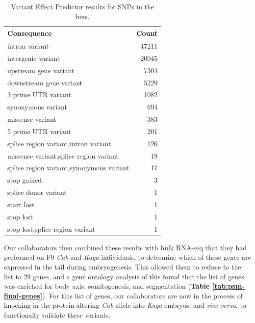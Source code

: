 \documentclass[
]{book}
\begin{document}
\begin{table}

\caption{\label{tab:int-consequence-tbl}Variant Effect Predictor results for SNPs in the bins.}
\centering
\begin{tabular}[t]{l|r}
\hline
Consequence & Count\\
\hline
intron variant & 47211\\
\hline
intergenic variant & 20045\\
\hline
upstream gene variant & 7304\\
\hline
downstream gene variant & 5229\\
\hline
3 prime UTR variant & 1082\\
\hline
synonymous variant & 694\\
\hline
missense variant & 383\\
\hline
5 prime UTR variant & 201\\
\hline
splice region variant,intron variant & 126\\
\hline
missense variant,splice region variant & 19\\
\hline
splice region variant,synonymous variant & 17\\
\hline
stop gained & 3\\
\hline
splice donor variant & 1\\
\hline
start lost & 1\\
\hline
stop lost & 1\\
\hline
stop lost,splice region variant & 1\\
\hline
\end{tabular}
\end{table}

Our collaborators then combined these results with bulk RNA-seq that they had performed on F0 \emph{Cab} and \emph{Kaga} individuals, to determine which of these genes are expressed in the tail during embryogenesis. This allowed them to reduce to the list to 29 genes, and a gene ontology analysis of this found that the list of genes was enriched for body axis, somitogenesis, and segmentation (\textbf{Table \ref{tab:psm-final-genes}}). For this list of genes, our collaborators are now in the process of knocking in the protein-altering \emph{Cab} allele into \emph{Kaga} embryos, and \emph{vice versa}, to functionally validate these variants.
\end{document}
